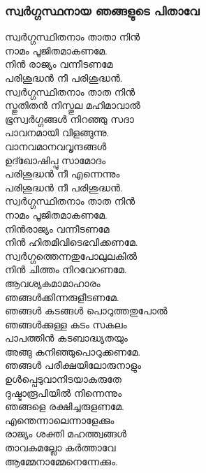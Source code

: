 \documentclass[20pt]{beamer}
\newcommand{\Priest}[1]{\color{white}#1}
\newcommand{\People}[1]{\color{yellow}#1}
\begin{document}
\begin{frame}[allowframebreaks]
\frametitle{സ്വര്‍ഗ്ഗസ്ഥനായ ഞങ്ങളുടെ പിതാവേ}
\Priest{
സ്വര്‍ഗ്ഗസ്ഥിതനാം താതാ നിന്‍\\
നാമം പൂജിതമാകണമേ.\\
നിന്‍ രാജ്യം വന്നീടണമേ\\
പരിശുദ്ധന്‍ നീ പരിശുദ്ധന്‍.\\
}
\bigbreak
\People{
സ്വര്‍ഗ്ഗസ്ഥിതനാം താത നിന്‍\\
സ്തുതിതന്‍ നിസ്തുല മഹിമാവാല്‍\\
ഭൂസ്വര്‍ഗ്ഗങ്ങള്‍ നിറഞ്ഞു സദാ\\
പാവനമായി വിളങ്ങുന്നു.\\
\bigbreak
വാനവമാനവവൃന്ദങ്ങള്‍\\
ഉദ്ഖോഷിപ്പു സാമോദം\\
പരിശുദ്ധന്‍ നീ എന്നെന്നും\\
പരിശുദ്ധന്‍ നീ പരിശുദ്ധന്‍.\\
\bigbreak
സ്വര്‍ഗ്ഗസ്ഥിതനാം താത നിന്‍\\
നാമം പൂജിതമാകണമേ.\\ 
നിന്‍രാജ്യം വന്നീടണമേ\\
നിന്‍ ഹിതമിവിടെഭവിക്കണമേ.\\
\bigbreak
സ്വര്‍ഗ്ഗത്തെന്നതുപോലുലകില്‍\\
നിന്‍ ചിത്തം നിറവേറണമേ.\\
ആവശ്യകമാമാഹാരം\\
ഞങ്ങള്‍ക്കിന്നരുളീടണമേ.\\
\bigbreak
ഞങ്ങള്‍ കടങ്ങള്‍ പൊറുത്തതുപോല്‍\\
ഞങ്ങള്‍ക്കുള്ള കടം സകലം\\ 
പാപത്തിന്‍ കടബാദ്ധ്യതയും\\ 
അങ്ങു കനിഞ്ഞുപൊറുക്കണമേ.\\
\bigbreak
ഞങ്ങള്‍ പരീക്ഷയിലോരുനാളും\\
ഉള്‍പ്പെടുവാനിടയാകരുതേ\\ 
ദുഷ്ടാരൂപിയില്‍ നിന്നെന്നും\\ 
ഞങ്ങളെ രക്ഷിച്ചരുളണമേ.\\
\bigbreak
എന്തെന്നാലെന്നാളേക്കും\\ 
രാജ്യം ശക്തി മഹത്ത്വങ്ങള്‍\\
താവകമല്ലോ കര്‍ത്താവേ\\
ആമ്മേനാമ്മേനെന്നേക്കും.\\
}
\end{frame}
\end{document}
